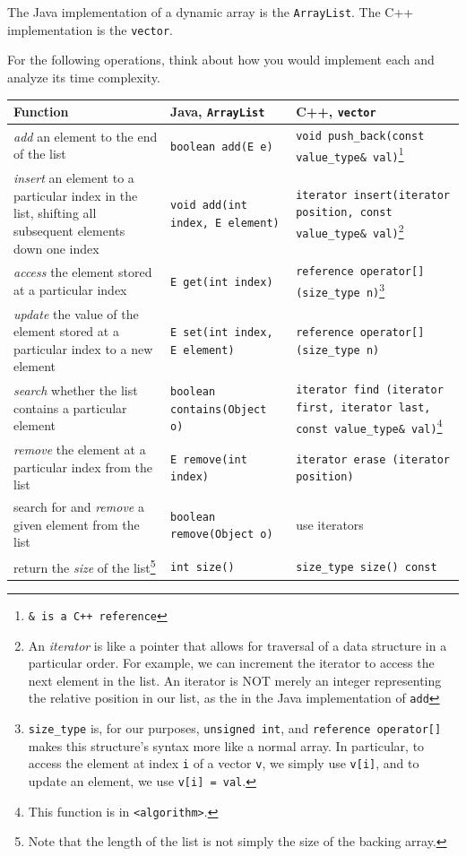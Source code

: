 The Java implementation of a dynamic array is the \texttt{ArrayList}. The C++ implementation is the \texttt{vector}.

For the following operations, think about how you would implement each and analyze its time complexity. 

\begin{center}\begin{tabular}{ | p{5cm} | p{5cm} | p{5cm} | }
    \hline
    \textbf{Function}	&	\textbf{Java, \texttt{ArrayList}}	&	\textbf{C++, \texttt{vector}} \\ \hline
    \textit{add} an element to the end of the list		&	\texttt{boolean add(E e)}	&	\texttt{void push\_back(const value\_type\& val)}\footnote{\texttt{\& is a C++ reference}} \\ \hline
    \textit{insert} an element to a particular index in the list, shifting all subsequent elements down one index	&	\texttt{void add(int index, E element)}		&	\texttt{iterator insert(iterator position, const value\_type\& val)}\footnote{An \textit{iterator} is like a pointer that allows for traversal of a data structure in a particular order. For example, we can increment the iterator to access the next element in the list. An iterator is NOT merely an integer representing the relative position in our list, as the in the Java implementation of \texttt{add}}	\\ \hline
    \textit{access} the element stored at a particular index	&	\texttt{E get(int index)}		&	\texttt{reference operator[] (size\_type n)}\footnote{\texttt{size\_type} is, for our purposes, \texttt{unsigned int}, and \texttt{reference operator[]} makes this structure's syntax more like a normal array. In particular, to access the element at index \texttt{i} of a vector \texttt{v}, we simply use \texttt{v[i]}, and to update an element, we use \texttt{v[i] = val}.}	\\ \hline
    \textit{update} the value of the element stored at a particular index to a new element & \texttt{E set(int index, E element)} & \texttt{reference operator[] (size\_type n)} \\ \hline
    \textit{search} whether the list contains a particular element & \texttt{boolean contains(Object o)} & \texttt{iterator find (iterator first, iterator last, const value\_type\& val)}\footnote{This function is in \texttt{<algorithm>}.} \\ \hline
    \textit{remove} the element at a particular index from the list & \texttt{E remove(int index)} & \texttt{iterator erase (iterator position)} \\ \hline
    search for and \textit{remove} a given element from the list & \texttt{boolean remove(Object o)} & use iterators \\ \hline
    return the \textit{size} of the list\footnote{Note that the length of the list is not simply the size of the backing array.} & \texttt{int size()} & \texttt{size\_type size() const} \\ \hline
	\end{tabular}\end{center}
